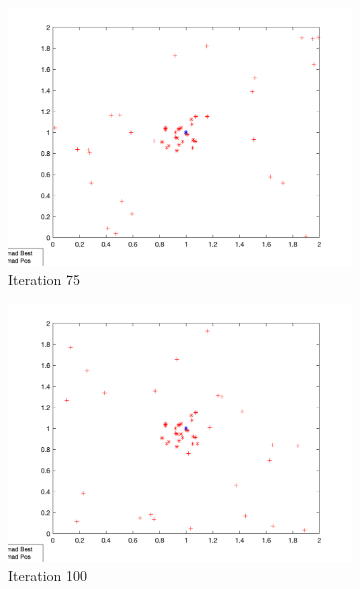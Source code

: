 \begin{figure}
\begin{subfigure}[b]{0.4\textwidth}
    \includegraphics[width=\textwidth]{img/roam/roam-iter-75}
    \caption{Iteration 75}
    \label{fig:roam-iter-2}
  \end{subfigure}
  \begin{subfigure}[b]{0.4\textwidth}
    \includegraphics[width=\textwidth]{img/roam/roam-iter-100}
    \caption{Iteration 100}
    \label{fig:roam-iter-3}
  \end{subfigure}
  \begin{subfigure}[b]{0.4\textwidth}

\end{subfigure}
\end{figure}
